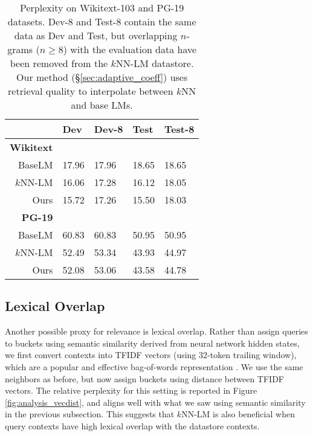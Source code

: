 \documentclass[11pt]{article}
\begin{document}
\begin{table}[t!]
\setlength\tabcolsep{4pt}
\begin{center}
\begin{tabular}{ r | C{10mm} | C{10mm} | C{10mm} | C{10mm} }
\toprule
 & Dev & Dev-8 & Test & Test-8 \\
\midrule
{\small \bf Wikitext} & & & & \\
BaseLM & 17.96 & 17.96 & 18.65 & 18.65 \\
$k$NN-LM & 16.06 & 17.28 & 16.12 & 18.05 \\
Ours & 15.72   & 17.26 & 15.50 & 18.03 \\
\midrule
{\small \bf PG-19} & & & & \\
BaseLM & 60.83 & 60.83 & 50.95 & 50.95 \\
$k$NN-LM & 52.49 & 53.34 & 43.93 & 44.97 \\
Ours   & 52.08 & 53.06 & 43.58 & 44.78 \\
\bottomrule
\end{tabular}
\end{center}
\caption{Perplexity on Wikitext-103 and PG-19 datasets. Dev-8 and Test-8 contain the same data as Dev and Test, but overlapping $n$-grams ($n \geq 8$) with the evaluation data have been removed from the $k$NN-LM datastore. Our method (\S\ref{sec:adaptive_coeff}) uses retrieval quality to interpolate between $k$NN and base LMs.}
\label{tab:overlap_ppl}
\end{table}

\subsection{Lexical Overlap}

\label{sec:analysis_bow}

Another possible proxy for relevance is lexical overlap. Rather than assign queries to buckets using semantic similarity derived from neural network hidden states, we first convert contexts into TFIDF vectors (using 32-token trailing window), which are a popular and effective bag-of-words representation \cite{chen2017reading}. We use the same neighbors as before, but now assign buckets using distance between TFIDF vectors. The relative perplexity for this setting is reported in Figure \ref{fig:analysis_vecdist}, and aligns well with what we saw using semantic similarity in the previous subsection. This suggests that $k$NN-LM is also beneficial when query contexts have high lexical overlap with the datastore contexts.
\end{document}

